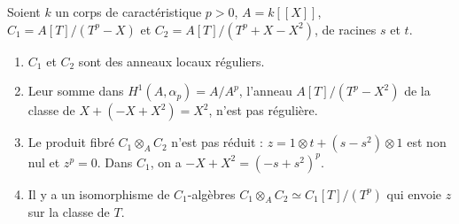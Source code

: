 \begin{encadre}
\begin{theoreme}
Soient $k$ un corps de caractéristique $p > 0$, $A = k[[X]]$, $C_1 = A[T]/(T^p - X)$ et $C_2 = A[T]/(T^p + X - X^2)$, de racines $s$ et $t$.
\begin{enumerate}
\item $C_1$ et $C_2$ sont des anneaux locaux réguliers.
\item Leur somme dans $H^1(A, \alpha_p) = A/A^p$, l'anneau $A[T]/(T^p - X^2)$ de la classe de $X + (-X + X^2) = X^2$, n'est pas régulière.
\item Le produit fibré $C_1 \otimes_A C_2$ n'est pas réduit : $z = 1 \otimes t + (s - s^2) \otimes 1$ est non nul et $z^p = 0$. Dans $C_1$, on a $-X + X^2 = (-s + s^2)^p$.
\item Il y a un isomorphisme de $C_1$-algèbres $C_1 \otimes_A C_2 \simeq C_1[T]/(T^p)$ qui envoie $z$ sur la classe de $T$.
\end{enumerate}
\end{theoreme}
\end{encadre}

